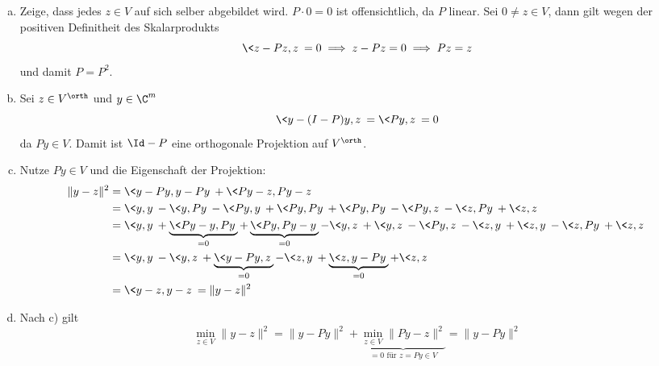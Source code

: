 \documentclass[a4paper]{scrartcl}
\begin{document}
\newpage
\begin{aufgabe}
	\begin{enumerate}[a)]
		\item
			Zeige, dass jedes $z\in V$ auf sich selber abgebildet wird.
			$P\cdot 0 = 0$ ist offensichtlich, da $P$ linear.
			Sei $0\neq z \in V$, dann gilt wegen der positiven Definitheit des Skalarprodukts
			\[
				\<z-Pz,z\> = 0 \implies z-Pz = 0 \implies Pz=z
			\]
			und damit $P=P^2$.
		\item
			Sei $z\in V^\orth$ und $y\in \C^m$
			\[
				\<y-(I-P)y,z\> = \<Py,z\> = 0
			\]
			da $Py \in V$.
			Damit ist $\Id - P$ eine orthogonale Projektion auf $V^\orth$.
		\item
			Nutze $Py\in V$ und die Eigenschaft der Projektion:
			\begin{align*}
				\|y-z\|^2
				&=\<y-Py,y-Py\> + \<Py-z,Py-z\> \\
				&= \<y,y\> - \<y,Py\> - \<Py,y\> + \<Py,Py\> + \<Py,Py\> - \<Py,z\> - \<z,Py\> + \<z,z\>\\
				&= \<y,y\> + \underbrace{\<Py-y,Py\>}_{=0} + \underbrace{\<Py,Py-y\>}_{=0} -\<y,z\> + \<y,z\> - \<Py,z\> - \<z,y\>+\<z,y\> - \<z,Py\> + \<z,z\>\\
				&= \<y,y\> - \<y,z\> + \underbrace{\<y-Py,z\>}_{=0} - \<z,y\> + \underbrace{\<z,y-Py\>}_{=0} + \<z,z\> \\
				&= \<y-z,y-z\> = \|y-z\|^2
			\end{align*}
		\item
			Nach c) gilt
			\[
				\min_{z\in V} \|y-z\|^2 = \|y-Py\|^2 + \underbrace{\min_{z\in V}\|Py-z\|^2}_{=0 \text{ für $z=Py\in V$}} = \|y-Py\|^2
			\]
	\end{enumerate}
\end{aufgabe}
\end{document}
